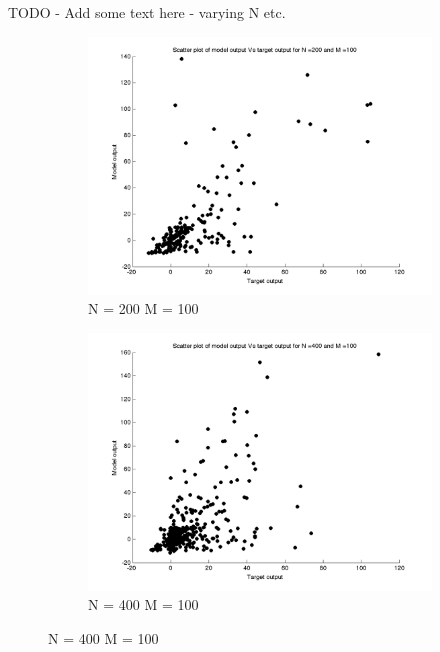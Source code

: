 \documentclass{article}
\begin{document}
TODO - Add some text here - varying N etc.
\begin{figure}[H]

\begin{subfigure}{.5\textwidth}
\centering
\includegraphics[width=\linewidth]{D2/Scatter/VaryingN_N200M100}
\caption{N = 200 M = 100}
\end{subfigure}
\begin{subfigure}{.5\textwidth}
\includegraphics[width=\linewidth]{D2/Scatter/VaryingN_N400M100}
\caption{N = 400 M = 100}
\end{subfigure}



\end{figure}
\end{document}
